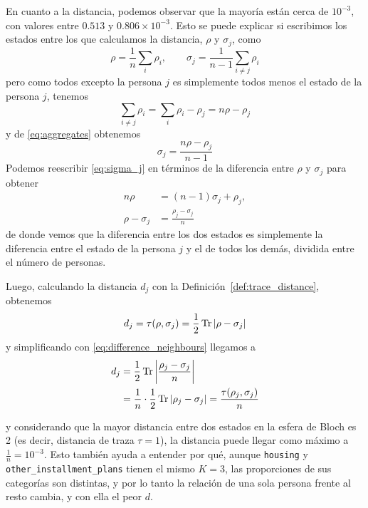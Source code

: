 \documentclass{ieeeaccess}
\begin{document}
En cuanto a la distancia, podemos observar que la mayoría están cerca de $10^{-3}$, con valores entre $0.513$ y $0.806 \times 10^{-3}$. Esto se puede explicar si escribimos los estados entre los que calculamos la distancia, $\rho$ y $\sigma_j$, como
\begin{equation}
  \rho = \frac{1}{n}\sum_{i} \rho_i, \qquad \sigma_j = \frac{1}{n-1}\sum_{i \neq j} \rho_i
  \label{eq:aggregates}
\end{equation}
pero como todos excepto la persona $j$ es simplemente todos menos el estado de la persona $j$, tenemos
\begin{equation}
  \sum_{i \neq j} \rho_i = \sum_{i} \rho_i - \rho_j = n\rho - \rho_j
  \label{eq:sum_except_j}
\end{equation}
y de \eqref{eq:aggregates} obtenemos
\begin{equation}
  \sigma_j = \frac{n\rho - \rho_j}{n-1}
  \label{eq:sigma_j}
\end{equation}
Podemos reescribir \eqref{eq:sigma_j} en términos de la diferencia entre $\rho$ y $\sigma_j$ para obtener
\begin{equation}
  \begin{aligned}
    n\rho &= (n-1)\sigma_j + \rho_j, \\
    \rho - \sigma_j &= \frac{\rho_j - \sigma_j}{n}
  \end{aligned}
  \label{eq:difference_neighbours}
\end{equation}
de donde vemos que la diferencia entre los dos estados es simplemente la diferencia entre el estado de la persona $j$ y el de todos los demás, dividida entre el número de personas.

Luego, calculando la distancia $d_j$ con la Definición~\ref{def:trace_distance}, obtenemos
\begin{equation}
  d_j = \tau(\rho, \sigma_j) = \frac{1}{2}\Tr\abs{\rho - \sigma_j}
  \label{eq:d_j}
\end{equation}
y simplificando con \eqref{eq:difference_neighbours} llegamos a
\begin{equation}
  \begin{aligned}
    d_j &= \frac{1}{2}\Tr\abs{\frac{\rho_j - \sigma_j}{n}} \\
        &= \frac{1}{n}\cdot\frac{1}{2}\Tr\abs{\rho_j - \sigma_j} = \frac{\tau(\rho_j, \sigma_j)}{n}
  \end{aligned}
  \label{eq:d_j_person}
\end{equation}

y considerando que la mayor distancia entre dos estados en la esfera de Bloch es 2 (es decir, distancia de traza $\tau = 1$), la distancia puede llegar como máximo a $\frac{1}{n} = 10^{-3}$. Esto también ayuda a entender por qué, aunque \texttt{housing} y \texttt{other\_installment\_plans} tienen el mismo $K=3$, las proporciones de sus categorías son distintas, y por lo tanto la relación de una sola persona frente al resto cambia, y con ella el peor $d$.
\end{document}
